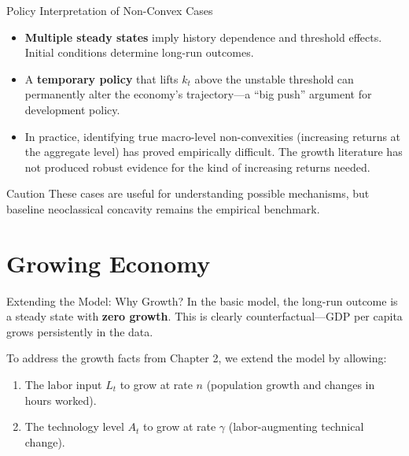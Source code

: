 \documentclass[aspectratio=169,10pt]{beamer}
\begin{document}
\begin{frame}{Policy Interpretation of Non-Convex Cases}
\begin{itemize}
  \item \textbf{Multiple steady states} imply history dependence and threshold effects. Initial conditions determine long-run outcomes.
  \item A \textbf{temporary policy} that lifts $k_t$ above the unstable threshold can permanently alter the economy's trajectory---a ``big push'' argument for development policy.
  \item In practice, identifying true macro-level non-convexities (increasing returns at the aggregate level) has proved empirically difficult. The growth literature has not produced robust evidence for the kind of increasing returns needed.
\end{itemize}
\begin{block}{Caution}
These cases are useful for understanding possible mechanisms, but baseline neoclassical concavity remains the empirical benchmark.
\end{block}
\end{frame}

\section{Growing Economy}

\begin{frame}{Extending the Model: Why Growth?}
In the basic model, the long-run outcome is a steady state with \textbf{zero growth}. This is clearly counterfactual---GDP per capita grows persistently in the data.

\medskip
To address the growth facts from Chapter 2, we extend the model by allowing:
\begin{enumerate}
  \item The labor input $L_t$ to grow at rate $n$ (population growth and changes in hours worked).
  \item The technology level $A_t$ to grow at rate $\gamma$ (labor-augmenting technical change).
\end{enumerate}
\end{frame}
\end{document}
